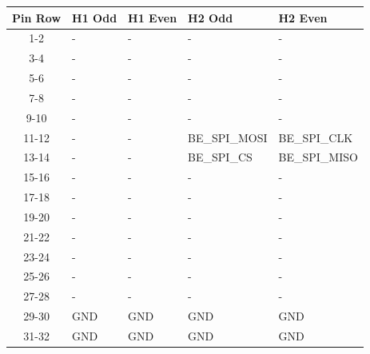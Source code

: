 \begin{table}[!h]
    \centering
    \begin{tabular}{cllll}
        \toprule[1.5pt]
        \textbf{Pin Row}   & \textbf{H1 Odd}  & \textbf{H1 Even} & \textbf{H2 Odd} & \textbf{H2 Even} \\
        \midrule
        1-2                & -                & -                & -               & -                \\
        3-4                & -                & -                & -               & -                \\
        5-6                & -                & -                & -               & -                \\
        7-8                & -                & -                & -               & -                \\
        9-10               & -                & -                & -               & -                \\
        11-12              & -                & -                & BE\_SPI\_MOSI   & BE\_SPI\_CLK     \\
        13-14              & -                & -                & BE\_SPI\_CS     & BE\_SPI\_MISO    \\
        15-16              & -                & -                & -               & -                \\
        17-18              & -                & -                & -               & -                \\
        19-20              & -                & -                & -               & -                \\
        21-22              & -                & -                & -               & -                \\
        23-24              & -                & -                & -               & -                \\
        25-26              & -                & -                & -               & -                \\
        27-28              & -                & -                & -               & -                \\
        29-30              & GND              & GND              & GND             & GND              \\
        31-32              & GND              & GND              & GND             & GND              \\

\end{tabular}
\end{table}
